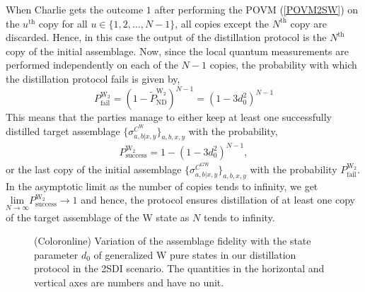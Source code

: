 \documentclass[reprint,superscriptaddress,nofootinbib,amsmath,amssymb,aps,pra,longbibliography]{revtex4-1}
\begin{document}
When Charlie gets the outcome $1$ after performing the POVM (\ref{POVM2SW}) on the $u^{\text{th}}$ copy for all $u \in \{1, 2, . . . , N-1\}$,  all copies except the $N^{\text{th}}$ copy are discarded. Hence, in this case the output of the distillation protocol is the $N^{\text{th}}$ copy of the initial assemblage. Now, since the local quantum measurements are performed independently on each of the $N-1$ copies, the probability with which the distillation protocol fails is given by,
\begin{equation}
	P_{\text{fail}}^{\text{W}_2} = (1- \tilde{P}_{\text{ND}}^{\text{W}_2})^{N-1} = (1-3d_0^2)^{N-1}
	\label{PfailW2}
\end{equation} 
This means that the parties manage to either keep at least one successfully distilled target assemblage $\{\sigma_{a,b|x,y}^{C^{\text{W}}}\}_{a,b,x,y}$ with the probability, 
\begin{align}
P_{\text{success}}^{\text{W}_2} = 1-(1-3d_0^2)^{N-1},
\end{align}
or the last copy of the initial assemblage $\{\sigma_{a,b|x,y}^{C^{\text{GW}}}\}_{a,b,x,y}$ with the probability $P_{\text{fail}}^{\text{W}_2}$.
In the asymptotic limit as the number of copies tends to infinity, we get $\underset{N \rightarrow \infty}{\text{lim}} P_{\text{success}}^{\text{W}_2} \rightarrow 1$ and hence, the protocol ensures distillation of at least one copy of the target assemblage of the W state as $N$ tends to infinity.

\begin{figure}[!t]
\caption{\footnotesize (Coloronline) Variation of the assemblage fidelity with the state parameter $d_0$ of generalized W pure states in our distillation protocol in the 2SDI scenario. The quantities in the horizontal and vertical axes are numbers and have no unit.} 
\label{W2SAF_fig}
\end{figure}
\end{document}
